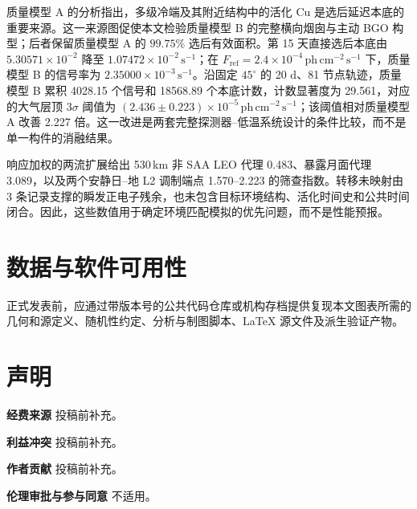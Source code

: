 \documentclass[11pt]{article}
\newcommand{\phcms}{\,\mathrm{ph\,cm^{-2}\,s^{-1}}}
\newcommand{\cps}{\,\mathrm{s^{-1}}}
\newcommand{\fref}{F_{\mathrm{ref}}}
\begin{document}
质量模型 A 的分析指出，多级冷端及其附近结构中的活化 Cu 是选后延迟本底的重要来源。这一来源图促使本文检验质量模型 B 的完整横向烟囱与主动 BGO 构型；后者保留质量模型 A 的 $99.75\%$ 选后有效面积。第 15 天直接选后本底由 $5.30571\times10^{-2}$ 降至 $1.07472\times10^{-2}\cps$；在 $\fref=2.4\times10^{-4}\phcms$ 下，质量模型 B 的信号率为 $2.35000\times10^{-3}\cps$。沿固定 $45^\circ$ 的 20 d、81 节点轨迹，质量模型 B 累积 4028.15 个信号和 18568.89 个本底计数，计数显著度为 29.561，对应的大气层顶 $3\sigma$ 阈值为 $(2.436\pm0.223)\times10^{-5}\phcms$；该阈值相对质量模型 A 改善 2.227 倍。这一改进是两套完整探测器--低温系统设计的条件比较，而不是单一构件的消融结果。

响应加权的两流扩展给出 530\,km 非 SAA LEO 代理 0.483、暴露月面代理 3.089，以及两个安静日--地 L2 调制端点 1.570--2.223 的筛查指数。转移未映射由 3 条记录支撑的瞬发正电子残余，也未包含目标环境结构、活化时间史和公共时间闭合。因此，这些数值用于确定环境匹配模拟的优先问题，而不是性能预报。

\section*{数据与软件可用性}
正式发表前，应通过带版本号的公共代码仓库或机构存档提供复现本文图表所需的几何和源定义、随机性约定、分析与制图脚本、LaTeX 源文件及派生验证产物。

\section*{声明}
\textbf{经费来源} 投稿前补充。

\textbf{利益冲突} 投稿前补充。

\textbf{作者贡献} 投稿前补充。

\textbf{伦理审批与参与同意} 不适用。
\end{document}
